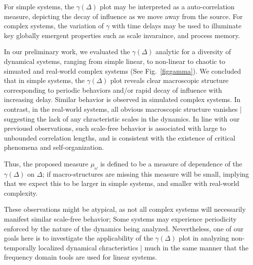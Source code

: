 \documentclass[onecolumn, compsoc,11pt]{IEEEtran}
\begin{document}
For simple systems, the $\gamma(\Delta)$ plot may be interpreted as a auto-correlation measure, depicting the decay of influence as we move away from the source. For complex systems, the variation of $\gamma$ with time delays may be used to illuminate key globally emergent properties such as scale invaraince, and process memory.

In our preliminary work, we evaluated the $\gamma(\Delta)$ analytic for a diversity of dynamical systems, ranging from simple linear, to non-linear to chaotic to simuated and real-world complex systems (See Fig.~\ref{figgamma}).
We concluded that in simple systems, the $\gamma(\Delta)$ plot reveals clear macroscopic structure corresponding to periodic behaviors and/or rapid decay of influence with increasing delay. Similar behavior is observed in simulated complex systems. In contrast, in the real-world systems, all obvious macroscopic  structure vanishes | suggesting the lack of any chracteristic  scales in  the dynamics. In line with our previousd observations, such scale-free behavior is associated with large to unbounded correlation lengths, and is consistent with the existence  of critical phenomena and self-organization.

Thus, the proposed measure $\mu_\omega$ is defined to be a measure of dependence of the $\gamma(\Delta)$ on $\Delta$; if macro-structures are missing this measure will be small, implying that we expect this to be larger in simple  systems, and smaller with real-world complexity.

These observations might  be atypical, as not all complex systems will necessarily manifest similar scale-free behavior; Some systems may experience periodicity enforced by  the nature of the dynamics being analyzed. Nevertheless, one of our goals here is to investigate the applicability of the  $\gamma(\Delta)$ plot in  analyzing non-temporally localized dynamical chracteristics | much in the same manner that the frequency domain tools are used for linear systems.
\end{document}
